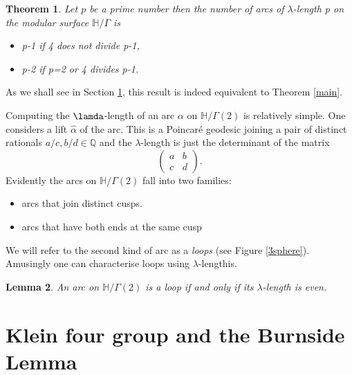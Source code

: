 \documentclass[12pt,a4paper]{amsart}
\newtheorem{thm}{Theorem}[section]
\newtheorem{lem}[thm]{Lemma}
\def\HH{\mathbb{H}}
\def\g2{\Gamma(2)}
\def\xx{\HH/\g2}
\begin{document}
\begin{thm}\label{modular arcs}
	Let $p$ be a prime number then the number of arcs of
	$\lambda$-length p on the modular surface
	$\mathbb{H}/\Gamma$ is 
	
	\begin{itemize}
		\item p-1 if 4 does not divide p-1,
		\item p-2 if p=2 or 4 divides p-1.
	\end{itemize}


\end{thm}

As we shall see in Section \ref{}, this result is indeed equivalent to Theorem \ref{main}. 

Computing the $\lamda$-length of an arc $\alpha$ on $\xx$ 
is relatively simple.
One considers a lift $\hat{\alpha}$ of the arc.
This is a Poincaré geodesic joining a pair of distinct rationals
$a/c,b/d \in \mathbb{Q}$ and the $\lambda$-length is just
the determinant of the matrix
$$ 
 \begin{pmatrix} a & b \\ c & d \end{pmatrix}.
$$
Evidently the arcs on $\xx$ fall into two families:
\begin{itemize}
	\item arcs that join distinct cusps. 
	\item arcs that have both ends at the same cusp
\end{itemize}
We will refer to the second kind of arc as a \textit{loops}
(see Figure \ref{3sphere}).
Amusingly one can characterise loops using $\lambda$-lengthis.
\begin{lem}
	An arc on $\xx$ is a loop if and only if its
	$\lambda$-length is even.
\end{lem}


\section{Klein four group and the Burnside Lemma}
\end{document}
